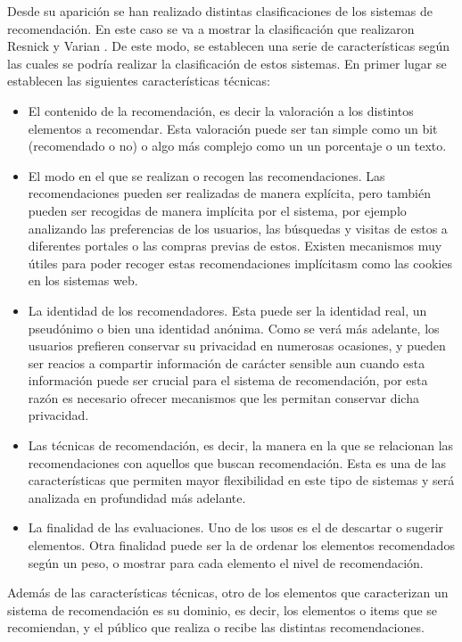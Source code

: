 Desde su aparición se han realizado distintas clasificaciones de los sistemas de recomendación. En este caso se va a mostrar la clasificación que realizaron Resnick y Varian \cite{Resnick:1997:RS:245108.245121}. De este modo, se establecen una serie de características según las cuales se podría realizar la clasificación de estos sistemas. En primer lugar se establecen las siguientes características técnicas:

\begin{itemize}
\item El contenido de la recomendación, es decir la valoración a los distintos elementos a recomendar. Esta valoración puede ser tan simple como un bit (recomendado o no) o algo más complejo como un un porcentaje o un texto.
\item El modo en el que se realizan o recogen las recomendaciones. Las recomendaciones pueden ser realizadas de manera explícita, pero también pueden ser recogidas de manera implícita por el sistema, por ejemplo analizando las preferencias de los usuarios, las búsquedas y visitas de estos a diferentes portales o las compras previas de estos. Existen mecanismos muy útiles para poder recoger estas recomendaciones implícitasm como las cookies en los sistemas web.
\item La identidad de los recomendadores. Esta puede ser la identidad real, un pseudónimo o bien una identidad anónima. Como se verá más adelante, los usuarios prefieren conservar su privacidad en numerosas ocasiones, y pueden ser reacios a compartir información de carácter sensible aun cuando esta información puede ser crucial para el sistema de recomendación, por esta razón es necesario ofrecer mecanismos que les permitan conservar dicha privacidad.
\item Las técnicas de recomendación, es decir, la manera en la que se relacionan las recomendaciones con aquellos que buscan recomendación. Esta es una de las características que permiten mayor flexibilidad en este tipo de sistemas y será analizada en profundidad más adelante.
\item La finalidad de las evaluaciones. Uno de los usos es el de descartar o sugerir elementos. Otra finalidad puede ser la de ordenar los elementos recomendados según un peso, o mostrar para cada elemento el nivel de recomendación. 
\end{itemize}

Además de las características técnicas, otro de los elementos que caracterizan un sistema de recomendación es su dominio, es decir, los elementos o items que se recomiendan, y el público que realiza o recibe las distintas recomendaciones.

